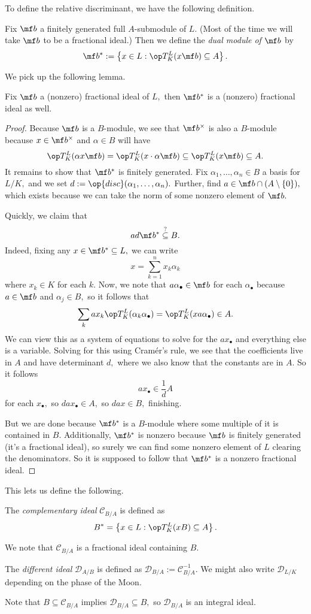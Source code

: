 \documentclass[../notes.tex]{subfiles}
\begin{document}
To define the relative discriminant, we have the following definition.
\begin{definition}
	Fix $\mf b$ a finitely generated full $A$-submodule of $L.$ (Most of the time we will take $\mf b$ to be a fractional ideal.) Then we define the \textit{dual module of $\mf b$} by
	\[\mf b^*:=\left\{x\in L:\op T^L_K(x\mf b)\subseteq A\right\}.\]
\end{definition}
We pick up the following lemma.
\begin{lemma}
	Fix $\mf b$ a (nonzero) fractional ideal of $L,$ then $\mf b^*$ is a (nonzero) fractional ideal as well.
\end{lemma}
\begin{proof}
	Because $\mf b$ is a $B$-module, we see that $\mf b^\times$ is also a $B$-module because $x\in\mf b^\times$ and $\alpha\in B$ will have
	\[\op T^L_K(\alpha x\mf b)=\op T^L_K(x\cdot\alpha\mf b)\subseteq\op T^L_K(x\mf b)\subseteq A.\]
	It remains to show that $\mf b^*$ is finitely generated. Fix $\alpha_1,\ldots,\alpha_n\in B$ a basis for $L/K,$ and we set $d:=\op{disc}(\alpha_1,\ldots,\alpha_n).$ Further, find $a\in\mf b\cap(A\setminus\{0\}),$ which exists because we can take the norm of some nonzero element of $\mf b.$

	Quickly, we claim that
	\[ad\mf b^*\stackrel?\subseteq B.\]
	Indeed, fixing any $x\in\mf b^*\subseteq L,$ we can write
	\[x=\sum_{k=1}^nx_k\alpha_k\]
	where $x_k\in K$ for each $k.$ Now, we note that $a\alpha_\bullet\in\mf b$ for each $\alpha_\bullet$ because $a\in\mf b$ and $\alpha_j\in B,$ so it follows that
	\[\sum_kax_k\op T^L_K(\alpha_k\alpha_\bullet)=\op T^L_K(xa\alpha_\bullet)\in A.\]
	We can view this as a system of equations to solve for the $ax_\bullet$ and everything else is a variable. Solving for this using Cram\'er's rule, we see that the coefficients live in $A$ and have determinant $d,$ where we also know that the constants are in $A.$ So it follows
	\[ax_\bullet\in\frac1dA\]
	for each $x_\bullet,$ so $dax_\bullet\in A,$ so $dax\in B,$ finishing.

	But we are done because $\mf b^*$ is a $B$-module where some multiple of it is contained in $B.$ Additionally, $\mf b^*$ is nonzero because $\mf b$ is finitely generated (it's a fractional ideal), so surely we can find some nonzero element of $L$ clearing the denominators. So it is supposed to follow that $\mf b^*$ is a nonzero fractional ideal.
\end{proof}
This lets us define the following.
\begin{definition}
	The \textit{complementary ideal} $\mathcal C_{B/A}$ is defined as
	\[B^*=\left\{x\in L:\op T_K^L(xB)\subseteq A\right\}.\]
\end{definition}
We note that $\mathcal C_{B/A}$ is a fractional ideal containing $B.$
\begin{definition}
	The \textit{different ideal} $\mathcal D_{A/B}$ is defined as $\mathcal D_{B/A}:=\mathcal C_{B/A}^{-1}.$ We might also write $\mathcal D_{L/K}$ depending on the phase of the Moon.
\end{definition}
Note that $B\subseteq\mathcal C_{B/A}$ implies $\mathcal D_{B/A}\subseteq B,$ so $\mathcal D_{B/A}$ is an integral ideal.
\end{document}
